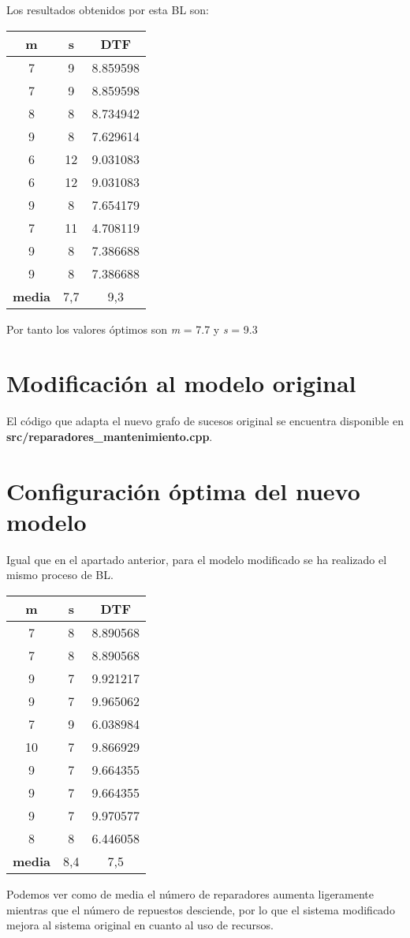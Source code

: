 Los resultados obtenidos por esta BL son:
\begin{table}[H]
\centering
\begin{tabular}{|ccc|}
\hline
\multicolumn{1}{|c|}{\textbf{m}} & \multicolumn{1}{c|}{\textbf{s}} & \textbf{DTF} \\ \hline
7 & 9 & 8.859598 \\
7 & 9 & 8.859598 \\
8 & 8 & 8.734942 \\
9 & 8 & 7.629614 \\
6 & 12 & 9.031083 \\
6 & 12 & 9.031083 \\
9 & 8 & 7.654179 \\
7 & 11 & 4.708119 \\
9 & 8 & 7.386688 \\
9 & 8 & 7.386688 \\ \hline
\multicolumn{1}{|c|}{\textbf{media}} & \multicolumn{1}{c|}{7,7} & 9,3 \\ \hline
\end{tabular}
\end{table}

Por tanto los valores óptimos son \textit{m} = 7.7 y \textit{s} = 9.3

\section{Modificación al modelo original}
El código que adapta el nuevo grafo de sucesos original se encuentra disponible en \\ \textbf{src/reparadores\_mantenimiento.cpp}.

\section{Configuración óptima del nuevo modelo}
Igual que en el apartado anterior, para el modelo modificado se ha realizado el mismo proceso de BL.

\begin{table}[H]
\centering
\begin{tabular}{|ccc|}
\hline
\multicolumn{1}{|c|}{\textbf{m}} & \multicolumn{1}{c|}{\textbf{s}} & \textbf{DTF} \\ \hline
7 & 8 & 8.890568 \\
7 & 8 & 8.890568 \\
9 & 7 & 9.921217 \\
9 & 7 & 9.965062 \\
7 & 9 & 6.038984 \\
10 & 7 & 9.866929 \\
9 & 7 & 9.664355 \\
9 & 7 & 9.664355 \\
9 & 7 & 9.970577 \\
8 & 8 & 6.446058 \\ \hline
\multicolumn{1}{|c|}{\textbf{media}} & \multicolumn{1}{c|}{8,4} & 7,5 \\ \hline
\end{tabular}
\end{table}

Podemos ver como de media el número de reparadores aumenta ligeramente mientras que el número de repuestos desciende, por lo que el sistema modificado mejora al sistema original en cuanto al uso de recursos.
